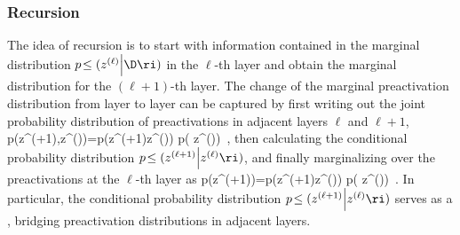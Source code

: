 \subsubsection{Recursion}
The idea of recursion is to start with information contained in the marginal distribution $p\!\le( z^{(\ell)}\Big\vert\D\ri)$ in the $\ell$-th layer and obtain the marginal distribution for the $(\ell+1)$-th layer.
The change of the marginal preactivation distribution from layer to layer can be captured by first writing out the joint probability distribution of preactivations in adjacent layers $\ell$ and $\ell+1$,
\be\label{eq:joint-distribution-adjacent-layers}
p\!\le(z^{(\ell+1)},z^{(\ell)}\Big\vert\D\ri)=p\!\le(z^{(\ell+1)}\Big\vert z^{(\ell)}\ri) p\!\le( z^{(\ell)}\Big\vert\D\ri)\, ,
\ee
then calculating the conditional probability distribution $p\!\le(z^{(\ell+1)}\Big\vert z^{(\ell)}\ri)$, and finally marginalizing over the preactivations at the $\ell$-th layer as
\be\label{eq:marginal-integrated-out-ell-layer}
p\!\le(z^{(\ell+1)}\Big\vert\D\ri)=\int {} p\!\le(z^{(\ell+1)}\Big\vert z^{(\ell)}\ri)  p\!\le( z^{(\ell)}\Big\vert\D\ri)\, .
\ee
In particular, the conditional probability distribution $p\!\le(z^{(\ell+1)}\Big\vert z^{(\ell)}\ri)$ serves as a , bridging preactivation distributions in adjacent layers.

